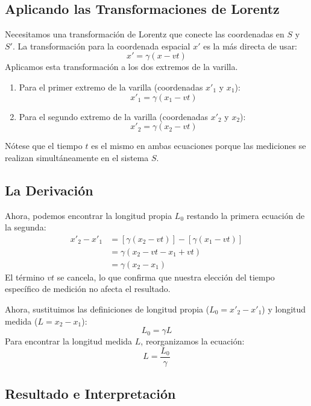 \documentclass[11pt,a4paper]{article}
\begin{document}
\subsection{Aplicando las Transformaciones de Lorentz}

Necesitamos una transformación de Lorentz que conecte las coordenadas en $S$ y $S'$. La transformación para la coordenada espacial $x'$ es la más directa de usar:
\[ x' = \gamma (x - vt) \]
Aplicamos esta transformación a los dos extremos de la varilla.
\begin{enumerate}
    \item Para el primer extremo de la varilla (coordenadas $x'_1$ y $x_1$):
    \[ x'_1 = \gamma (x_1 - vt) \]
    \item Para el segundo extremo de la varilla (coordenadas $x'_2$ y $x_2$):
    \[ x'_2 = \gamma (x_2 - vt) \]
\end{enumerate}
Nótese que el tiempo $t$ es el mismo en ambas ecuaciones porque las mediciones se realizan simultáneamente en el sistema $S$.

\subsection{La Derivación}

Ahora, podemos encontrar la longitud propia $L_0$ restando la primera ecuación de la segunda:
\begin{align*}
x'_2 - x'_1 &= \left[ \gamma (x_2 - vt) \right] - \left[ \gamma (x_1 - vt) \right] \\
&= \gamma (x_2 - vt - x_1 + vt) \\
&= \gamma (x_2 - x_1)
\end{align*}
El término $vt$ se cancela, lo que confirma que nuestra elección del tiempo específico de medición no afecta el resultado.

Ahora, sustituimos las definiciones de longitud propia ($L_0 = x'_2 - x'_1$) y longitud medida ($L = x_2 - x_1$):
\[ L_0 = \gamma L \]
Para encontrar la longitud medida $L$, reorganizamos la ecuación:
\[ L = \frac{L_0}{\gamma} \]

\subsection{Resultado e Interpretación}
\end{document}

